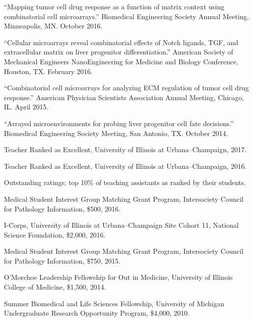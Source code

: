 \documentclass[11pt,article,oneside]{memoir}
\begin{document}
\bigskip 


\ind ``Mapping tumor cell drug response as a function of matrix context using combinatorial cell microarrays.'' Biomedical Engineering Society Annual Meeting, Minneapolis, MN. October 2016.

\ind ``Cellular microarrays reveal combinatorial effects of Notch ligands, TGF\textbeta, and extracellular matrix on liver progenitor differentiation.'' American Society of Mechanical Engineers NanoEngineering for Medicine and Biology Conference, Houston, TX. February 2016.

\ind ``Combinatorial cell microarrays for analyzing ECM regulation of tumor cell drug response.'' American Physician Scientists Association Annual Meeting, Chicago, IL. April 2015.

\ind ``Arrayed microenvironments for probing liver progenitor cell fate decisions.'' Biomedical Engineering Society Meeting, San Antonio, TX. October 2014.

\bigskip


\ind Teacher Ranked as Excellent, University of Illinois at Urbana--Champaign, 2017.

\ind Teacher Ranked as Excellent, University of Illinois at Urbana--Champaign, 2016.

\ind \hspace{0.35in} \footnotesize Outstanding ratings; top 10\% of teaching assistants as ranked by their students. \normalsize\vspace{0.05in}

\ind Medical Student Interest Group Matching Grant Program, Intersociety Council for Pathology Information, \$500, 2016.

\ind I-Corps, University of Illinois at Urbana--Champaign Site Cohort 11, National Science Foundation, \$2,000, 2016.

\ind Medical Student Interest Group Matching Grant Program, Intersociety Council for Pathology Information, \$750, 2015.

\ind O'Morchoe Leadership Fellowship for Out in Medicine, University of Illinois College of Medicine, \$1,500, 2014.

\ind Summer Biomedical and Life Sciences Fellowship, University of Michigan Undergraduate Research Opportunity Program, \$4,000, 2010.
\end{document}
